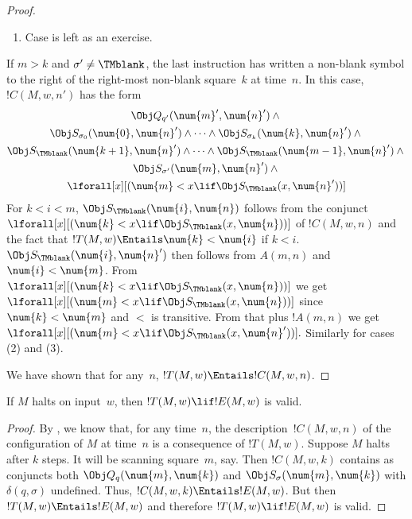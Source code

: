 \documentclass[../../../include/open-logic-section]{subfiles}
\begin{document}
\begin{proof}
\begin{enumerate}
\item Case  is left as an exercise.
\end{enumerate}
If $m > k$ and $\sigma' \neq \TMblank$, the last instruction has
written a non-blank symbol to the right of the right-most non-blank
square~$k$ at time~$n$. In this case, $!C(M, w, n')$ has the form
\begin{multline*}
\Obj Q_{q'}(\num{m}', \num{n}') \land {}\\
\Obj S_{\sigma_0}(\num{0}, \num{n}') \land \dots \land
\Obj S_{\sigma_k}(\num{k}, \num{n}') \land {}\\
\Obj S_{\TMblank}(\num{k+1}, \num{n}') \land \dots \land
\Obj S_{\TMblank}(\num{m-1}, \num{n}') \land {}\\
\Obj S_{\sigma'}(\num{m},
\num{n}') \land {}\\
\lforall[x][(\num{m} < x
  \lif \Obj S_\TMblank(x, \num{n}'))]
\end{multline*}
For $k < i < m$, $\Obj S_{\TMblank}(\num{i}, \num{n})$ follows from
the conjunct $\lforall[x][(\num{k} < x \lif \Obj S_\TMblank(x,
  \num{n}))]$ of $!C(M, w, n)$ and the fact that $!T(M, w) \Entails
\num{k} < \num{i}$ if $k < i$. $\Obj S_{\TMblank}(\num{i}, \num{n}')$
then follows from $A(m, n)$ and $\num{i} < \num{m}$.  From
$\lforall[x][(\num{k} < x \lif \Obj S_\TMblank(x, \num{n}))]$ we get
$\lforall[x][(\num{m} < x \lif \Obj S_\TMblank(x, \num{n}))]$ since
$\num{k}<\num{m}$ and $<$ is transitive.  From that plus $!A(m, n)$ we
get $\lforall[x][(\num{m} < x \lif \Obj S_\TMblank(x, \num{n}'))].$
Similarly for cases (2) and (3).

We have shown that for any~$n$, $!T(M, w) \Entails !C(M, w, n)$.
\end{proof}

\begin{lem}
If $M$ halts on input~$w$, then $!T(M, w) \lif
!E(M, w)$ is valid.
\end{lem}

\begin{proof}
By , we know that, for any time~$n$, the
description~$!C(M, w, n)$ of the configuration of $M$ at time~$n$ is a
consequence of $!T(M, w)$.  Suppose $M$ halts after $k$ steps. It will
be scanning square~$m$, say. Then $!C(M, w, k)$ contains as conjuncts
both $\Obj Q_q(\num{m}, \num{k})$ and $\Obj S_\sigma(\num{m},
\num{k})$ with $\delta(q,\sigma)$ undefined. Thus, $!C(M, w, k)
\Entails !E(M, w)$. But then $!T(M, w) \Entails !E(M, w)$ and
therefore $!T(M, w) \lif !E(M, w)$ is valid.
\end{proof}
\end{document}
